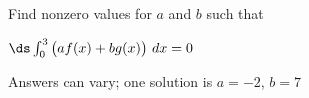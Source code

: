 {Find nonzero values for $a$ and $b$ such that 

$\ds \int_0^3 \big(af(x)+bg(x)\big) \ dx=0$
}
{Answers can vary; one solution is $a=-2$, $b=7$
}

